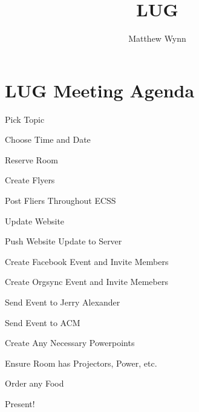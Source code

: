 \documentclass[12pt,letterpaper,oneside]{article}
\title{LUG}
\author{Matthew Wynn}
\newenvironment{checklist}{%
	\begin{list}{}{}%
	\let\olditem\item
	\renewcommand\item{\olditem[$\Box$] }
	}{%
	\end{list}
}
\begin{document}
\section*{LUG Meeting Agenda}
\begin{checklist}
	\item Pick Topic
	\item Choose Time and Date
	\item Reserve Room
	\item Create Flyers
	\item Post Fliers Throughout ECSS
	\item Update Website
	\item Push Website Update to Server
	\item Create Facebook Event and Invite Members
	\item Create Orgsync Event and Invite Memebers
	\item Send Event to Jerry Alexander
	\item Send Event to ACM
	\item Create Any Necessary Powerpoints
	\item Ensure Room has Projectors, Power, etc.
	\item Order any Food
	\item Present!
\end{checklist}
\end{document}
